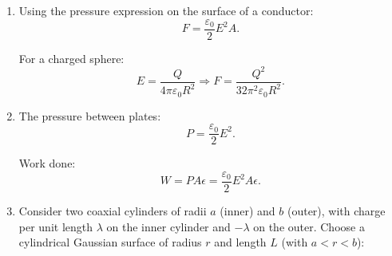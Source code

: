 \documentclass[12pt]{article}
\begin{document}
\begin{enumerate}
Thus, the electric field exists only outside the shell. The energy stored in the electric field is:
\[
U = \frac{\varepsilon_0}{2} \int_{\text{all space}} E^2 \, d\tau.
\]

Since $E=0$ inside the shell, we only integrate over $r \ge R$. Substitute the field:

\[
E^2 = \left(\frac{1}{4\pi \varepsilon_0} \frac{e}{r^2}\right)^2
= \frac{e^2}{16 \pi^2 \varepsilon_0^2 r^4}.
\]

The volume element in spherical coordinates:
\[
d\tau = 4\pi r^2 dr.
\]

Therefore, the energy integral becomes:

\[
U = \frac{\varepsilon_0}{2} \int_R^\infty E^2 \, d\tau
= \frac{\varepsilon_0}{2} \int_R^\infty \frac{e^2}{16 \pi^2 \varepsilon_0^2 r^4} \cdot 4\pi r^2 \, dr.
\]

Simplify:

\[
U = \frac{\varepsilon_0}{2} \cdot \frac{e^2}{16 \pi^2 \varepsilon_0^2} \cdot 4\pi \int_R^\infty \frac{1}{r^2} \, dr.
\]

\[
U = \frac{e^2}{8\pi \varepsilon_0} \int_R^\infty \frac{1}{r^2} \, dr.
\]

\[
\int_R^\infty \frac{1}{r^2} dr = \left[-\frac{1}{r}\right]_R^\infty = \frac{1}{R}.
\]

\[
U = \frac{e^2}{8\pi \varepsilon_0 R}.
\]

Equating this energy to the electron rest energy:
\[
mc^2 = \frac{e^2}{8\pi \varepsilon_0 R},
\]
Thus,
\[
R = \frac{1}{8\pi \varepsilon_0} \frac{e^2}{mc^2}.
\]

This is the standard classical estimate of the electron size, which is about $1.4 \times 10^{-15}$ meters.

\item Using the pressure expression on the surface of a conductor:
\[
F = \frac{\varepsilon_0}{2} E^2 A.
\]

For a charged sphere:
\[
E = \frac{Q}{4\pi\varepsilon_0 R^2}
\Rightarrow
F = \frac{Q^2}{32\pi^2 \varepsilon_0 R^2}.
\]

\item The pressure between plates:
\[
P = \frac{\varepsilon_0}{2}E^2.
\]

Work done:
\[
W = P A \epsilon = \frac{\varepsilon_0}{2}E^2 A \epsilon.
\]

\item Consider two coaxial cylinders of radii $a$ (inner) and $b$ (outer), with charge per unit length $\lambda$ on the inner cylinder and $-\lambda$ on the outer. Choose a cylindrical Gaussian surface of radius $r$ and length $L$ (with $a < r < b$):


\end{enumerate}
\end{document}
